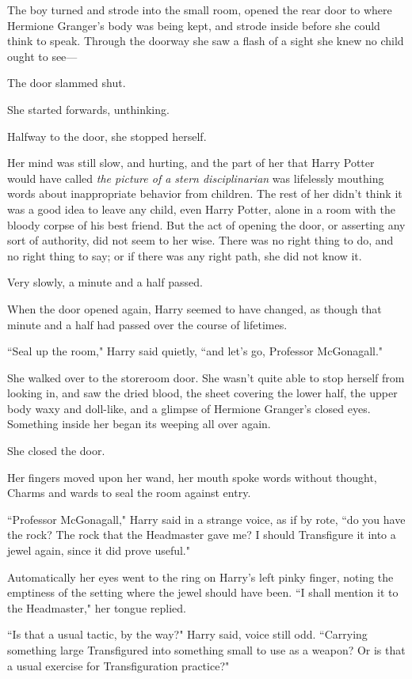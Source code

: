 The boy turned and strode into the small room, opened the rear door to where Hermione Granger's body was being kept, and strode inside before she could think to speak. Through the doorway she saw a flash of a sight she knew no child ought to see—

The door slammed shut.

She started forwards, unthinking.

Halfway to the door, she stopped herself.

Her mind was still slow, and hurting, and the part of her that Harry Potter would have called \emph{the picture of a stern disciplinarian} was lifelessly mouthing words about inappropriate behavior from children. The rest of her didn't think it was a good idea to leave any child, even Harry Potter, alone in a room with the bloody corpse of his best friend. But the act of opening the door, or asserting any sort of authority, did not seem to her wise. There was no right thing to do, and no right thing to say; or if there was any right path, she did not know it.

Very slowly, a minute and a half passed.

\later

When the door opened again, Harry seemed to have changed, as though that minute and a half had passed over the course of lifetimes.

``Seal up the room," Harry said quietly, ``and let's go, Professor McGonagall."

She walked over to the storeroom door. She wasn't quite able to stop herself from looking in, and saw the dried blood, the sheet covering the lower half, the upper body waxy and doll-like, and a glimpse of Hermione Granger's closed eyes. Something inside her began its weeping all over again.

She closed the door.

Her fingers moved upon her wand, her mouth spoke words without thought, Charms and wards to seal the room against entry.

``Professor McGonagall," Harry said in a strange voice, as if by rote, ``do you have the rock? The rock that the Headmaster gave me? I should Transfigure it into a jewel again, since it did prove useful."

Automatically her eyes went to the ring on Harry's left pinky finger, noting the emptiness of the setting where the jewel should have been. ``I shall mention it to the Headmaster," her tongue replied.

``Is that a usual tactic, by the way?" Harry said, voice still odd. ``Carrying something large Transfigured into something small to use as a weapon? Or is that a usual exercise for Transfiguration practice?"

